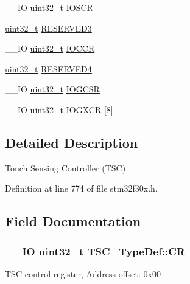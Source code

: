 \begin{DoxyCompactItemize}
\-\_\-\-\_\-\-I\-O \hyperlink{stdint_8h_a435d1572bf3f880d55459d9805097f62}{uint32\-\_\-t} \hyperlink{struct_t_s_c___type_def_a95191a7f002c8738f835ffbb356e28c6}{I\-O\-S\-C\-R}
\item 
\hyperlink{stdint_8h_a435d1572bf3f880d55459d9805097f62}{uint32\-\_\-t} \hyperlink{struct_t_s_c___type_def_a0d47873260f8f0c16b8ec77e1edc8789}{R\-E\-S\-E\-R\-V\-E\-D3}
\item 
\-\_\-\-\_\-\-I\-O \hyperlink{stdint_8h_a435d1572bf3f880d55459d9805097f62}{uint32\-\_\-t} \hyperlink{struct_t_s_c___type_def_ad468fece7d1f454e0f8967edc9068c73}{I\-O\-C\-C\-R}
\item 
\hyperlink{stdint_8h_a435d1572bf3f880d55459d9805097f62}{uint32\-\_\-t} \hyperlink{struct_t_s_c___type_def_a75a37e293ded1627c94cf521df950e31}{R\-E\-S\-E\-R\-V\-E\-D4}
\item 
\-\_\-\-\_\-\-I\-O \hyperlink{stdint_8h_a435d1572bf3f880d55459d9805097f62}{uint32\-\_\-t} \hyperlink{struct_t_s_c___type_def_aa166b00195900a37903238cc8d50ba36}{I\-O\-G\-C\-S\-R}
\item 
\-\_\-\-\_\-\-I\-O \hyperlink{stdint_8h_a435d1572bf3f880d55459d9805097f62}{uint32\-\_\-t} \hyperlink{struct_t_s_c___type_def_a67d0b2e4315451b591e3d6b09c6c9cfc}{I\-O\-G\-X\-C\-R} \mbox{[}8\mbox{]}
\end{DoxyCompactItemize}


\subsection{Detailed Description}
Touch Sensing Controller (T\-S\-C) 

Definition at line 774 of file stm32f30x.\-h.



\subsection{Field Documentation}
\hypertarget{struct_t_s_c___type_def_a5242c0f547b4c65ad619dae5cf670b17}{
\subsubsection[{C\-R}]{\setlength{\rightskip}{0pt plus 5cm}\-\_\-\-\_\-\-I\-O {\bf uint32\-\_\-t} T\-S\-C\-\_\-\-Type\-Def\-::\-C\-R}}\label{struct_t_s_c___type_def_a5242c0f547b4c65ad619dae5cf670b17}
T\-S\-C control register, Address offset\-: 0x00 

